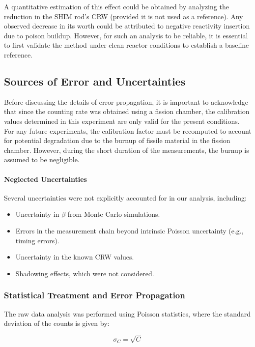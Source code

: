 A quantitative estimation of this effect could be obtained by analyzing the reduction in the SHIM rod's CRW (provided it is not used as a reference). Any observed decrease in its worth could be attributed to negative reactivity insertion due to poison buildup. However, for such an analysis to be reliable, it is essential to first validate the method under clean reactor conditions to establish a baseline reference.

\subsection{Sources of Error and Uncertainties}

Before discussing the details of error propagation, it is important to acknowledge that since the counting rate was obtained using a fission chamber, the calibration values determined in this experiment are only valid for the present conditions. For any future experiments, the calibration factor must be recomputed to account for potential degradation due to the burnup of fissile material in the fission chamber. However, during the short duration of the measurements, the burnup is assumed to be negligible.

\paragraph{Neglected Uncertainties} Several uncertainties were not explicitly accounted for in our analysis, including:

\begin{itemize}
    \item Uncertainty in $\beta$ from Monte Carlo simulations.
    \item Errors in the measurement chain beyond intrinsic Poisson uncertainty (e.g., timing errors).
    \item Uncertainty in the known CRW values.
    \item Shadowing effects, which were not considered.
\end{itemize}

\subsubsection{Statistical Treatment and Error Propagation}

The raw data analysis was performed using Poisson statistics, where the standard deviation of the counts is given by:

\begin{equation}
\sigma_{C} = \sqrt{C}
\end{equation}

